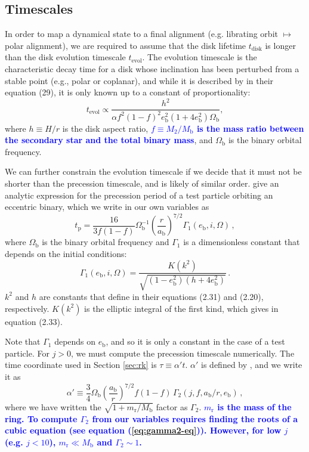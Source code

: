 \documentclass[twocolumn,linenumbers]{aastex631}
\newcommand{\RR}[1]{\textcolor{blue}{\bf#1}} %
\begin{document}
\subsection{Timescales}
In order to map a dynamical state to a final alignment (e.g. librating orbit $\mapsto$ polar alignment), we are required to assume that the disk lifetime $t_\text{disk}$ is longer than the disk evolution timescale $t_\text{evol}$. The evolution timescale is the characteristic decay time for a disk whose inclination has been perturbed from a stable point (e.g., polar or coplanar), and while it is described by \citet{lubow2018} in their equation (29), it is only known up to a constant of proportionality:
\begin{equation}
    \label{eq:tevol}
    t_\text{evol} \propto \frac{h^2}{\alpha f^2(1-f)^2 e_\text{b}^2(1+4e_\text{b}^2) \Omega_\text{b}} ,
\end{equation}
where $h\equiv H/r$ is the disk aspect ratio, \RR{$f\equiv M_2/M_\text{b}$ is the mass ratio between the secondary star and the total binary mass}, and $\Omega_\text{b}$ is the binary orbital frequency. 

We can further constrain the evolution timescale if we decide that it must not be shorter than the precession timescale, and is likely of similar order. \citet[see eq. (2.32)]{farago2010} give an analytic expression for the precession period of a test particle orbiting an eccentric binary, which we write in our own variables as
\begin{equation}
    t_\text{p} = \frac{16}{3f(1-f)} \Omega_\text{b}^{-1} \left(\frac{r}{a_\text{b}}\right)^{7/2} \Gamma_1(e_\text{b},i,\Omega)\, ,
\end{equation}
where $\Omega_\text{b}$ is the binary orbital frequency and $\Gamma_1$ is a dimensionless constant that depends on the initial conditions:
\begin{equation}
    \Gamma_1(e_\text{b},i,\Omega) = \frac{K(k^2)}{\sqrt{(1-e_\text{b}^2)(h+4e_\text{b}^2)}} \, .
\end{equation}
$k^2$ and $h$ are constants that \citet{farago2010} define in their equations (2.31) and (2.20), respectively. $K(k^2)$ is the elliptic integral of the first kind, which \citet{farago2010} gives in equation (2.33).

Note that $\Gamma_1$ depends on $e_\text{b}$, and so it is only a constant in the case of a test particle. For $j>0$, we must compute the precession timescale numerically. The time coordinate used in Section \ref{sec:rk} is $\tau \equiv \alpha' t$. $\alpha'$ is defined by \citet[see eq. 3.9]{farago2010}, and we write it as
\begin{equation}
    \alpha' \equiv \frac{3}{4} \Omega_\text{b} \left(\frac{a_\text{b}}{r}\right)^{7/2} f(1-f) \,\Gamma_2(j,f,a_\text{b}/r, e_\text{b}) \, ,
\end{equation}
where we have written the $\sqrt{1+m_\text{r}/M_\text{b}}$ factor as $\Gamma_2$. \RR{$m_\text{r}$ is the mass of the ring. To compute $\Gamma_2$ from our variables requires finding the roots of a cubic equation (see equation (\ref{eq:gamma2-eq})). However, for low $j$ (e.g. $j<10$), $m_\text{r} \ll M_\text{b}$ and $\Gamma_2 \sim 1$.}
\end{document}
